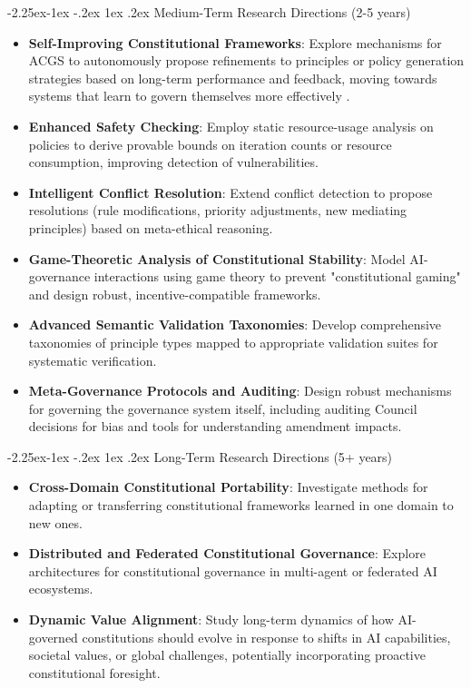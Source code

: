 \documentclass[manuscript,screen,review,anonymous,9pt]{acmart}
\makeatletter
\renewcommand\subsection{\@startsection{subsection}{2}{\z@}%
  {-2.25ex\@plus -1ex \@minus -.2ex}%
  {1ex \@plus .2ex}%
  {\normalfont\large\bfseries}}
\makeatother
\begin{document}
\subsection{Medium-Term Research Directions (2-5 years)}
\label{subsec:medium_term_research}
\begin{itemize}[leftmargin=*,itemsep=1pt,parsep=1pt]
    \item \textbf{Self-Improving Constitutional Frameworks}: Explore mechanisms for ACGS to autonomously propose refinements to principles or policy generation strategies based on long-term performance and feedback, moving towards systems that learn to govern themselves more effectively \cite{Zhao2025AbsoluteZero}.
    \item \textbf{Enhanced Safety Checking}: Employ static resource-usage analysis on policies to derive provable bounds on iteration counts or resource consumption, improving detection of vulnerabilities.
    \item \textbf{Intelligent Conflict Resolution}: Extend conflict detection to propose resolutions (rule modifications, priority adjustments, new mediating principles) based on meta-ethical reasoning.
    \item \textbf{Game-Theoretic Analysis of Constitutional Stability}: Model AI-governance interactions using game theory to prevent "constitutional gaming" and design robust, incentive-compatible frameworks.
    \item \textbf{Advanced Semantic Validation Taxonomies}: Develop comprehensive taxonomies of principle types mapped to appropriate validation suites for systematic verification.
    \item \textbf{Meta-Governance Protocols and Auditing}: Design robust mechanisms for governing the governance system itself, including auditing Council decisions for bias and tools for understanding amendment impacts.
\end{itemize}

\subsection{Long-Term Research Directions (5+ years)}
\label{subsec:long_term_research}
\begin{itemize}[leftmargin=*,itemsep=1pt,parsep=1pt]
    \item \textbf{Cross-Domain Constitutional Portability}: Investigate methods for adapting or transferring constitutional frameworks learned in one domain to new ones.
    \item \textbf{Distributed and Federated Constitutional Governance}: Explore architectures for constitutional governance in multi-agent or federated AI ecosystems.
    \item \textbf{Dynamic Value Alignment}: Study long-term dynamics of how AI-governed constitutions should evolve in response to shifts in AI capabilities, societal values, or global challenges, potentially incorporating proactive constitutional foresight.
\end{itemize}
\end{document}
